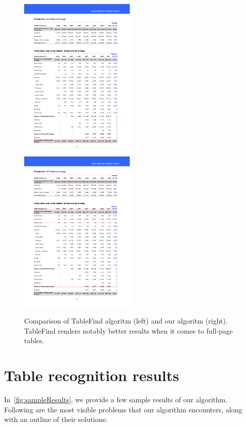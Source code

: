 \begin{figure}[t]
\centering
\includegraphics[width=15em]{img/results/tableFind1Tess.jpg}
\includegraphics[width=15em]{img/results/tableFind1Us.png}
\caption{Comparison of TableFind algoritm (left) and our algoritm (right). TableFind renders notably better results when it comes to full-page tables.}
\label{fig:tableFindComparison_Tess}
\end{figure}

\section{Table recognition results}

In~\cref{fig:sampleResults}, we provide a few sample results of our algorithm. Following are the most visible problems that our algorithm encounters, along with an outline of their solutions:

